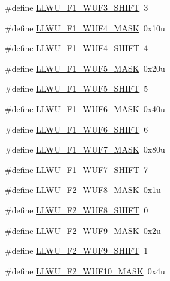 \begin{DoxyCompactItemize}
\#define \hyperlink{group___l_l_w_u___register___masks_gada64305bc36dde8d293f511de2183d0c}{L\+L\+W\+U\+\_\+\+F1\+\_\+\+W\+U\+F3\+\_\+\+S\+H\+I\+FT}~3
\item 
\#define \hyperlink{group___l_l_w_u___register___masks_ga9dad2dc81874baa09dac37d10cc4781d}{L\+L\+W\+U\+\_\+\+F1\+\_\+\+W\+U\+F4\+\_\+\+M\+A\+SK}~0x10u
\item 
\#define \hyperlink{group___l_l_w_u___register___masks_ga4ce65dd6db7f89bd5e6f0fb7df47a399}{L\+L\+W\+U\+\_\+\+F1\+\_\+\+W\+U\+F4\+\_\+\+S\+H\+I\+FT}~4
\item 
\#define \hyperlink{group___l_l_w_u___register___masks_ga2ba67283979e853e1601bd15a534523e}{L\+L\+W\+U\+\_\+\+F1\+\_\+\+W\+U\+F5\+\_\+\+M\+A\+SK}~0x20u
\item 
\#define \hyperlink{group___l_l_w_u___register___masks_ga56f1fa2e4a277de750be421a3b35df87}{L\+L\+W\+U\+\_\+\+F1\+\_\+\+W\+U\+F5\+\_\+\+S\+H\+I\+FT}~5
\item 
\#define \hyperlink{group___l_l_w_u___register___masks_ga25c6fc1f914e4e6cdc9863e9910a7a18}{L\+L\+W\+U\+\_\+\+F1\+\_\+\+W\+U\+F6\+\_\+\+M\+A\+SK}~0x40u
\item 
\#define \hyperlink{group___l_l_w_u___register___masks_gadc6ba47e215a21859a0cdb07637e3720}{L\+L\+W\+U\+\_\+\+F1\+\_\+\+W\+U\+F6\+\_\+\+S\+H\+I\+FT}~6
\item 
\#define \hyperlink{group___l_l_w_u___register___masks_ga085396c6707e1233072318b9f791a179}{L\+L\+W\+U\+\_\+\+F1\+\_\+\+W\+U\+F7\+\_\+\+M\+A\+SK}~0x80u
\item 
\#define \hyperlink{group___l_l_w_u___register___masks_ga6ec44402fb6f1879376fce39e4f48618}{L\+L\+W\+U\+\_\+\+F1\+\_\+\+W\+U\+F7\+\_\+\+S\+H\+I\+FT}~7
\item 
\#define \hyperlink{group___l_l_w_u___register___masks_ga76228bf3593a9417e43e509166c07fad}{L\+L\+W\+U\+\_\+\+F2\+\_\+\+W\+U\+F8\+\_\+\+M\+A\+SK}~0x1u
\item 
\#define \hyperlink{group___l_l_w_u___register___masks_ga88963ab5583725d163689b615ce5a638}{L\+L\+W\+U\+\_\+\+F2\+\_\+\+W\+U\+F8\+\_\+\+S\+H\+I\+FT}~0
\item 
\#define \hyperlink{group___l_l_w_u___register___masks_ga28d89e3d08f5a7db6ffbe56e9e35d771}{L\+L\+W\+U\+\_\+\+F2\+\_\+\+W\+U\+F9\+\_\+\+M\+A\+SK}~0x2u
\item 
\#define \hyperlink{group___l_l_w_u___register___masks_gabc3e93b75e1e8e95f392b59b5dbf6edf}{L\+L\+W\+U\+\_\+\+F2\+\_\+\+W\+U\+F9\+\_\+\+S\+H\+I\+FT}~1
\item 
\#define \hyperlink{group___l_l_w_u___register___masks_gae005607b6cb3ebf1a7def97cd8b2abc5}{L\+L\+W\+U\+\_\+\+F2\+\_\+\+W\+U\+F10\+\_\+\+M\+A\+SK}~0x4u

\end{DoxyCompactItemize}

